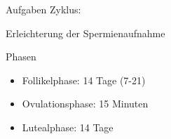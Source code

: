 \documentclass{beamer}
\begin{document}
\begin{frame}
\begin{columns}[c]
\begin{column}{7cm}
\begin{block}{Aufgaben Zyklus:}
\begin{itemize}
 Erleichterung der Spermienaufnahme

\end{itemize}
\end{block}


\pause

\begin{block}{Phasen}
\begin{itemize}
\item
Follikelphase: 14 Tage (7-21)
\item 
Ovulationsphase: 15 Minuten 
\item
Lutealphase: 14 Tage

\end{itemize}
\end{block}




\end{column}


\end{columns}

\end{frame}

\end{document}
